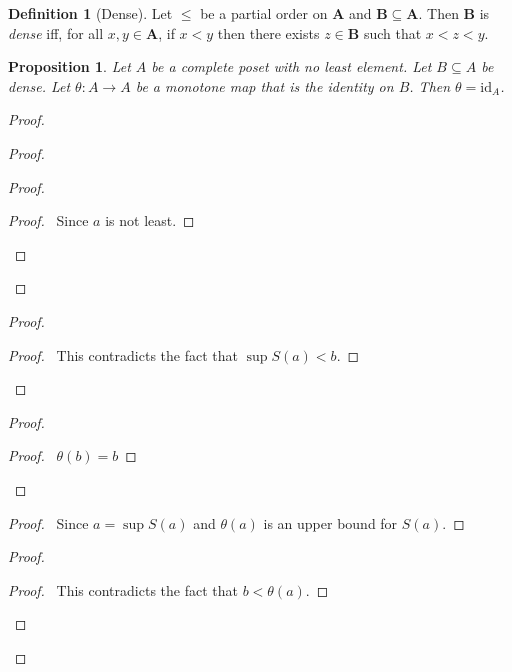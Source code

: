 \documentclass{book}
\let\qed\relax
\newtheorem{prop}[ax]{Proposition}
\theoremstyle{definition}
\newtheorem{df}[ax]{Definition}
\begin{document}
\begin{df}[Dense]
Let $\leq$ be a partial order on $\mathbf{A}$ and
$\mathbf{B} \subseteq \mathbf{A}$. Then $\mathbf{B}$ is \emph{dense} iff, for all $x,y \in \mathbf{A}$, if $x < y$ then there exists $z \in \mathbf{B}$ such that $x < z < y$.
\end{df}

\begin{prop}
\label{prop:orderisoid}
Let $A$ be a complete poset with no least element. Let $B \subseteq A$ be dense. Let $\theta : A \rightarrow A$ be a monotone map that is the identity on $B$. Then $\theta = \mathrm{id}_A$.
\end{prop}

\begin{proof}
\pf
{}
\begin{proof}
	\begin{proof}
		\begin{proof}
			\pf\ Since $a$ is not least.
		\end{proof}
	\end{proof}
\end{proof}
\begin{proof}
	\qedstep
	\begin{proof}
		\pf\ This contradicts the fact that $\sup S(a) < b$.
	\end{proof}
\end{proof}
\begin{proof}
	\begin{proof}
		\pf\ $\theta(b) = b$
	\end{proof}
\end{proof}
\begin{proof}
	\pf\ Since $a = \sup S(a)$ and $\theta(a)$ is an upper bound for $S(a)$.
\end{proof}
\begin{proof}
	\qedstep
	\begin{proof}
		\pf\ This contradicts the fact that $b < \theta(a)$.
	\end{proof}
\end{proof}
\qed
\end{proof}
\end{document}

